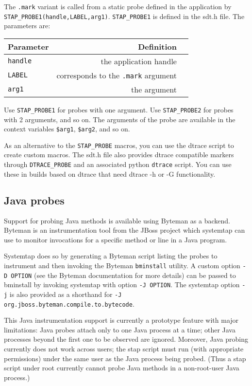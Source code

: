 \documentclass[twoside,english]{article}
\begin{document}
The \texttt{.mark} variant is called from a static probe defined in
the application by
\texttt{STAP\_PROBE1(handle,LABEL,arg1)}. \texttt{STAP\_PROBE1} is
defined in the sdt.h file.  The parameters are:


\begin{tabular}{|l|r|c|}
  Parameter & Definition \\ \hline
  \texttt{handle} & the application handle \\ \hline
  \texttt{LABEL} & corresponds to the \texttt{.mark} argument \\ \hline
  \texttt{arg1} & the argument \\ \hline
\end{tabular}


Use \texttt{STAP\_PROBE1} for probes with one argument.  Use
\texttt{STAP\_PROBE2} for probes with 2 arguments, and so on.  The
arguments of the probe are available in the context variables
\texttt{\$arg1}, \texttt{\$arg2}, and so on.

As an alternative to the \texttt{STAP\_PROBE} macros, you can use the
dtrace script to create custom macros. The sdt.h file also provides
dtrace compatible markers through \texttt{DTRACE\_PROBE} and an
associated python \texttt{dtrace} script.  You can use these in builds
based on dtrace that need dtrace -h or -G functionality.

\subsection{Java probes}
Support for probing Java methods is available using Byteman as a
backend. Byteman is an instrumentation tool from the JBoss project
which systemtap can use to monitor invocations for a specific method
or line in a Java program.

Systemtap does so by generating a Byteman script listing the probes to
instrument and then invoking the Byteman \texttt{bminstall} utility. A
custom option \texttt{-D OPTION} (see the Byteman documentation for
more details) can be passed to bminstall by invoking systemtap with
option \texttt{-J OPTION}. The systemtap option \texttt{-j} is also
provided as a shorthand for \texttt{-J
  org.jboss.byteman.compile.to.bytecode}.

This Java instrumentation support is currently a prototype feature
with major limitations: Java probes attach only to one Java process at
a time; other Java processes beyond the first one to be observed are
ignored. Moreover, Java probing currently does not work across users;
the stap script must run (with appropriate permissions) under the same
user as the Java process being probed. (Thus a stap script under
root currently cannot probe Java methods in a non-root-user Java process.)
\end{document}
